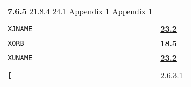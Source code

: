 \documentclass[a4paper]{scrbook}
\begin{document}
\begin{longtable}[]{@{}ll@{}}
\begin{minipage}[t]{0.70\columnwidth}
\textbf{\href{07-structured-objects.md\#765-uvector-the-primtype-1}{7.6.5}} \href{21-interrupts.md\#2184-gc}{21.8.4}
\href{24-efficiency-and-tastefulness.md\#241-efficiency}{24.1}
\href{appendix-1-a-look-inside.md\#appendix-1-a-look-inside}{Appendix 1}
\href{appendix-1-a-look-inside.md\#basic-data-structures}{Appendix 1}\strut
\end{minipage}\tabularnewline
\begin{minipage}[t]{0.24\columnwidth}\raggedright\strut
\strut
\end{minipage} & \begin{minipage}[t]{0.70\columnwidth}\raggedright\strut
\strut
\end{minipage}\tabularnewline
\begin{minipage}[t]{0.24\columnwidth}\raggedright\strut
\texttt{XJNAME}\strut
\end{minipage} & \begin{minipage}[t]{0.70\columnwidth}\raggedright\strut
\textbf{\href{23-mdl-as-a-system-process.md\#232-names}{23.2}}\strut
\end{minipage}\tabularnewline
\begin{minipage}[t]{0.24\columnwidth}\raggedright\strut
\texttt{XORB}\strut
\end{minipage} & \begin{minipage}[t]{0.70\columnwidth}\raggedright\strut
\textbf{\href{18-machine-words-and-bits.md\#185-bitwise-boolean-operations}{18.5}}\strut
\end{minipage}\tabularnewline
\begin{minipage}[t]{0.24\columnwidth}\raggedright\strut
\texttt{XUNAME}\strut
\end{minipage} & \begin{minipage}[t]{0.70\columnwidth}\raggedright\strut
\textbf{\href{23-mdl-as-a-system-process.md\#232-names}{23.2}}\strut
\end{minipage}\tabularnewline
\begin{minipage}[t]{0.24\columnwidth}\raggedright\strut
\strut
\end{minipage} & \begin{minipage}[t]{0.70\columnwidth}\raggedright\strut
\strut
\end{minipage}\tabularnewline
\begin{minipage}[t]{0.24\columnwidth}\raggedright\strut
\texttt{{[}}\strut
\end{minipage} & \begin{minipage}[t]{0.70\columnwidth}\raggedright\strut
\href{02-read-evaluate-print.md\#2631-non-pnames}{2.6.3.1}

\end{minipage}
\end{longtable}
\end{document}

